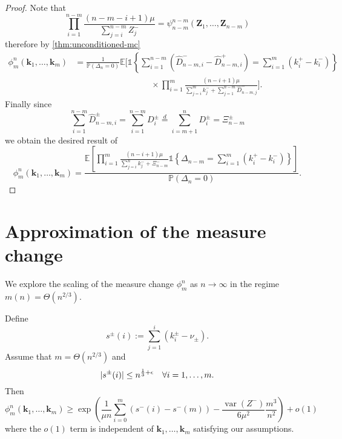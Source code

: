 \documentclass[draft]{scrartcl}
\newcommand{\E}{\mathbb E}
\newcommand{\littleo}{o}
\newcommand{\biasD}{\hat{D}}
\newcommand{\unconmc}{\psi}
\newcommand{\conmc}{\phi}
\newcommand{\defeq}{:=}
\newcommand{\eqdist}{\overset{d}{=}}
\newcommand{\indi}{\mathds{1}}
\newcommand{\vect}{\mathbf}
\renewcommand{\Pr}{\mathbb P}
\DeclareMathOperator{\var}{var}
\DeclarePairedDelimiter{\abs}{\lvert}{\rvert}
\begin{document}
\begin{proof}
    Note that
    \begin{equation}
        \prod_{i=1}^{n-m} \frac{(n - m - i + 1) \mu}{\sum_{j=i}^{n - m} Z_j^-} = \unconmc^{n-m}_{n-m}(\vect{Z}_1, \ldots, \vect{Z}_{n-m})
    \end{equation}
    therefore by \cref{thm:unconditioned-mc}
    \begin{align}
        \conmc^n_m(\vect{k}_1, \ldots, \vect{k}_m)
        &= \frac{1}{\Pr(\Delta_n = 0)}\E\Bigg[ \indi\left\{ \sum_{i=1}^{n-m} (\biasD_{n-m, i}^- - \biasD_{n-m, i}^+) = \sum_{i=1}^m (k^+_i - k^-_i)\right\} \nonumber \\
        &\hspace{9em} \times \prod_{i=1}^m \frac{(n - i + 1)\mu}{\sum_{j=i}^m k_j^- + \sum_{j = 1}^{n -m} \biasD_{n-m, j}^-} \Bigg].
    \end{align}
    Finally since
    \begin{equation}
        \sum_{i=1}^{n-m} \biasD^{\pm}_{n-m, i} = \sum_{i=1}^{n-m} D^{\pm}_i \eqdist \sum_{i=m+1}^n D^{\pm}_i = \Xi_{n-m}^{\pm}
    \end{equation}
    we obtain the desired result of
    \begin{equation}
        \conmc^n_m(\vect{k}_1, \ldots, \vect{k}_m) = \frac{
        \E \left[ \prod_{i=1}^m \frac{(n - i + 1)\mu}{\sum_{j=i}^n k_j^- + \Xi^-_{n - m}}
        \indi \left\{ \Delta_{n-m} = \sum_{i=1}^m (k^+_i - k^-_i) \right\}\right]
        }{\Pr(\Delta_n = 0)}.
    \end{equation}
\end{proof}

\section{Approximation of the measure change}

We explore the scaling of the measure change $\conmc^n_m$ as $n \to \infty$ in the regime $m(n) = \Theta(n^{2/3})$.

\begin{theorem}
    Define
    \begin{equation}
        s^{\pm}(i) \defeq \textstyle{\sum_{j=1}^i (k_i^{\pm} - \nu_{\pm})}.
    \end{equation}
    Assume that $m = \Theta(n^{2/3})$ and
    \begin{equation}
        \label{eq:s-condition}
        \abs{s^{\pm}(i)} \leq n^{\frac{1}{3} + \epsilon} \quad \forall i = 1, \ldots, m.
    \end{equation}
    Then
    \begin{equation}
        \conmc^n_m(\vect{k}_1, \ldots, \vect{k}_m)
        \geq \exp\left( \frac{1}{\mu n} \sum_{i=0}^m (s^-(i) - s^-(m)) - \frac{\var(Z^-)}{6 \mu^2} \frac{m^3}{n^2} \right) + \littleo(1)
    \end{equation}
    where the $\littleo(1)$ term is independent of $\vect{k}_1, \ldots, \vect{k}_m$ satisfying our assumptions.
\end{theorem}
\end{document}
